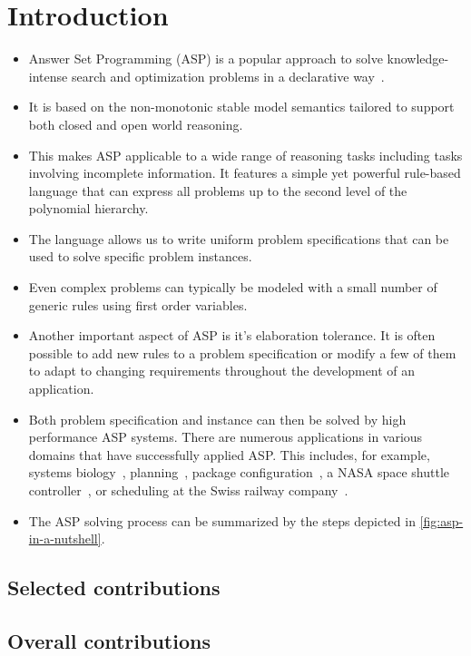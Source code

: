 \chapter{Introduction}\label{sec:introduction}

\begin{itemize}
  \item 
  Answer Set Programming (ASP) is a popular approach
  to solve knowledge-intense search and optimization problems in a declarative way~\cites{baral02a,gekakasc12a}.
  \item
  It is based on the non-monotonic stable model semantics
  tailored to support both closed and open world reasoning.
  \item 
  This makes ASP applicable to a wide range of reasoning tasks including tasks involving incomplete information.
  It features a simple yet powerful rule-based language
  that can express all problems up to the second level of the polynomial hierarchy.
  \item
  The language allows us to write uniform problem specifications that can be used to solve specific problem instances.
  \item
  Even complex problems can typically be modeled with a small number of generic rules using first order variables.
  \item
  Another important aspect of ASP is it's elaboration tolerance.
  It is often possible to add new rules to a problem specification or modify a few of them
  to adapt to changing requirements throughout the development of an application.
  \item 
  Both problem specification and instance can then be solved by high performance ASP systems.
  There are numerous applications in various domains that have successfully applied {ASP}.
  This includes, for example,  systems biology~\cite{kascsivi13a},
  planning~\cite{gekaknsc11a},
  package configuration~\cite{gekasc11c},
  a NASA space shuttle controller~\cite{nobagewaba01a}, or
  scheduling at the Swiss railway company~\cite{abjoossctowa21a}.
  \item
  
  The ASP solving process can be summarized by the steps depicted in \cref{fig:asp-in-a-nutshell}.
\end{itemize}

\section{Selected contributions}

\section{Overall contributions}

